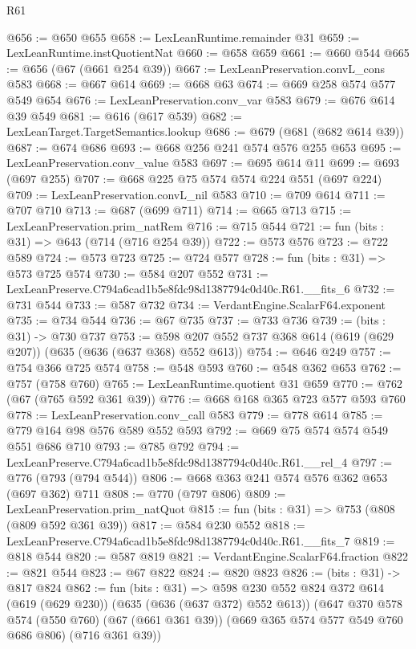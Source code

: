 \begin{lexlean}{R61}
\begin{coremodule}
@656 := @650 @655
@658 := LexLeanRuntime.remainder @31
@659 := LexLeanRuntime.instQuotientNat
@660 := @658 @659
@661 := @660 @544
@665 := @656 (@67 (@661 @254 @39))
@667 := LexLeanPreservation.convL_cons @583
@668 := @667 @614
@669 := @668 @63
@674 := @669 @258 @574 @577 @549 @654
@676 := LexLeanPreservation.conv_var @583
@679 := @676 @614 @39 @549
@681 := @616 (@617 @539)
@682 := LexLeanTarget.TargetSemantics.lookup
@686 := @679 (@681 (@682 @614 @39))
@687 := @674 @686
@693 := @668 @256 @241 @574 @576 @255 @653
@695 := LexLeanPreservation.conv_value @583
@697 := @695 @614 @11
@699 := @693 (@697 @255)
@707 := @668 @225 @75 @574 @574 @224 @551 (@697 @224)
@709 := LexLeanPreservation.convL_nil @583
@710 := @709 @614
@711 := @707 @710
@713 := @687 (@699 @711)
@714 := @665 @713
@715 := LexLeanPreservation.prim_natRem
@716 := @715 @544
@721 := fun (bits : @31) => @643 (@714 (@716 @254 @39))
@722 := @573 @576
@723 := @722 @589
@724 := @573 @723
@725 := @724 @577
@728 := fun (bits : @31) => @573 @725 @574
@730 := @584 @207 @552
@731 := LexLeanPreserve.C794a6cad1b5e8fdc98d1387794c0d40c.R61.__fits_6
@732 := @731 @544
@733 := @587 @732
@734 := VerdantEngine.ScalarF64.exponent
@735 := @734 @544
@736 := @67 @735
@737 := @733 @736
@739 := (bits : @31) -> @730 @737
@753 := @598 @207 @552 @737 @368 @614 (@619 (@629 @207)) (@635 (@636 (@637 @368) @552 @613))
@754 := @646 @249
@757 := @754 @366 @725 @574
@758 := @548 @593
@760 := @548 @362 @653
@762 := @757 (@758 @760)
@765 := LexLeanRuntime.quotient @31 @659
@770 := @762 (@67 (@765 @592 @361 @39))
@776 := @668 @168 @365 @723 @577 @593 @760
@778 := LexLeanPreservation.conv_call @583
@779 := @778 @614
@785 := @779 @164 @98 @576 @589 @552 @593
@792 := @669 @75 @574 @574 @549 @551 @686 @710
@793 := @785 @792
@794 := LexLeanPreserve.C794a6cad1b5e8fdc98d1387794c0d40c.R61.__rel_4
@797 := @776 (@793 (@794 @544))
@806 := @668 @363 @241 @574 @576 @362 @653 (@697 @362) @711
@808 := @770 (@797 @806)
@809 := LexLeanPreservation.prim_natQuot
@815 := fun (bits : @31) => @753 (@808 (@809 @592 @361 @39))
@817 := @584 @230 @552
@818 := LexLeanPreserve.C794a6cad1b5e8fdc98d1387794c0d40c.R61.__fits_7
@819 := @818 @544
@820 := @587 @819
@821 := VerdantEngine.ScalarF64.fraction
@822 := @821 @544
@823 := @67 @822
@824 := @820 @823
@826 := (bits : @31) -> @817 @824
@862 := fun (bits : @31) =>
  @598
    @230
    @552
    @824
    @372
    @614
    (@619 (@629 @230))
    (@635 (@636 (@637 @372) @552 @613))
    (@647
      @370
      @578
      @574
      (@550 @760)
      (@67 (@661 @361 @39))
      (@669 @365 @574 @577 @549 @760 @686 @806)
      (@716 @361 @39))

\end{coremodule}
\end{lexlean}
